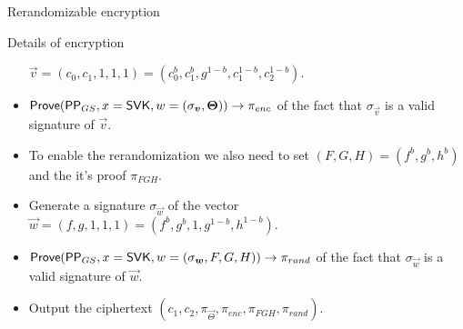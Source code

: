 \begin{frame}{Rerandomizable encryption}
\begin{block}{Details of encryption}
\begin{itemize}
    $\vec{v} = (c_0, c_1, 1, 1, 1) = (c_0^b, c_1^b, g^{1-b}, c_1^{1-b}, c_2^{1-b})$.
    \pause
  \item ${\mathsf{Prove}}(\mathsf{PP}_{GS}, x = \mathsf{SVK}, w=(\sigma_{\boldsymbol{v}}, \boldsymbol{\Theta})) \to \pi_{enc}$ of the fact that $\sigma_{\vec{v}}$ is a valid signature of $\vec{v}$.
    \pause
  \item To enable the rerandomization we also need to set $(F, G, H) = (f^b, g^b, h^b)$ and the it's proof $\pi_{FGH}$.
    \pause
  \item Generate a signature $\sigma_{\vec{w}}$ of the vector $\vec{w} = (f, g, 1, 1, 1) = (f^b, g^b, 1, g^{1-b}, h^{1-b})$.
    \pause
  \item ${\mathsf{Prove}}(\mathsf{PP}_{GS}, x = \mathsf{SVK}, w=(\sigma_{\boldsymbol{w}}, F, G, H)) \to \pi_{rand}$ of the fact that $\sigma_{\vec{w}}$ is a valid signature of $\vec{w}$.
    \pause
  \item Output the ciphertext $(c_1, c_2, \pi_{\vec{\Theta}}, \pi_{enc}, \pi_{FGH}, \pi_{rand})$.
  \end{itemize}
  \end{block}
\end{frame}

%      
%      
%      
%    


